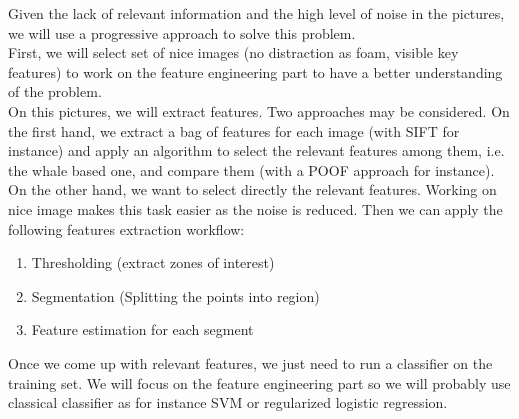 \documentclass[11pt,a4paper,oneside]{report}
\begin{document}
Given the lack of relevant information and the high level of noise in the pictures, we will use a progressive approach to solve this problem. \\
First, we will select set of nice images (no distraction as foam, visible key features) to work on the feature engineering part to have a better understanding of the problem.\\
On this pictures, we will extract features. Two approaches may be considered. On the first hand, we extract a bag of features for each image (with SIFT for instance) and apply an algorithm to select the relevant features among them, i.e. the whale based one, and compare them (with a POOF approach for instance). On the other hand, we want to select directly the relevant features. Working on nice image makes this task easier as the noise is reduced. Then we can apply the following features extraction workflow:
\begin{enumerate}
	\item Thresholding (extract zones of interest)
    \item Segmentation (Splitting the points into region)
    \item Feature estimation for each segment
\end{enumerate}
Once we come up with relevant features, we just need to run a classifier on the training set. We will focus on the feature engineering part so we will probably use classical classifier as for instance SVM or regularized logistic regression. 
\end{document}
